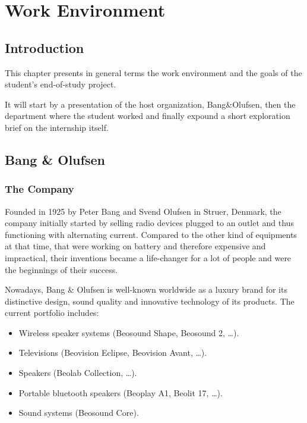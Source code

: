 
\chapter{Work Environment} %

\label{Chapter2} %



\section*{Introduction}

This chapter presents in general terms the work environment and the goals of the student's end-of-study project.

It will start by a presentation of the host organization, Bang\&Olufsen, then the department where the student worked and finally expound a short exploration brief on the internship itself.   


\section{Bang \& Olufsen}

\subsection{The Company}

Founded in 1925 by Peter Bang and Svend Olufsen in Struer, Denmark, the company initially started by selling radio devices plugged to an outlet and thus functioning with alternating current. Compared to the other kind of equipments at that time, that were working on battery and therefore expensive and impractical, their inventions became a life-changer for a lot of people and were the beginnings of their success. 

Nowadays, Bang \& Olufsen is well-known worldwide as a luxury brand for its distinctive design, sound quality and innovative technology of its products. The current portfolio includes:
\begin{itemize}
	\item Wireless speaker systems (Beosound Shape, Beosound 2, \dots).
	\item Televisions (Beovision Eclipse, Beovision Avant, \dots).
	\item Speakers (Beolab Collection, \dots).
	\item Portable bluetooth speakers (Beoplay A1, Beolit 17, \dots).
	\item Sound systems (Beosound Core).
\end{itemize}

